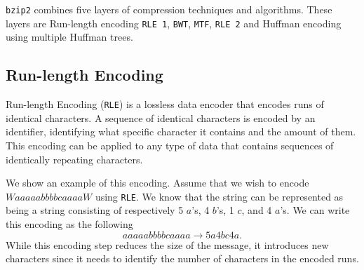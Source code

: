 \documentclass{article}
\begin{document}
\texttt{bzip2} combines five layers of compression techniques and algorithms. These layers are Run-length encoding \texttt{RLE 1}, \texttt{BWT}, \texttt{MTF}, \texttt{RLE 2} and Huffman encoding using multiple Huffman trees.

\subsection{Run-length Encoding}\label{BZIP2RLE}
Run-length Encoding (\texttt{RLE}) is a lossless data encoder that encodes runs of identical characters. A sequence of identical characters is encoded by an identifier, identifying what specific character it contains and the amount of them. This encoding can be applied to any type of data that contains sequences of identically repeating characters.

We show an example of this encoding. Assume that we wish to encode \(WaaaaabbbbcaaaaW\) using \texttt{RLE}. We know that the string can be represented as being a string consisting of respectively 5 \(a\)'s, 4 \(b\)'s, 1 \(c\), and 4 \(a\)'s. We can write this encoding as the following
\[
aaaaabbbbcaaaa \rightarrow 5a4bc4a.
\]
While this encoding step reduces the size of the message, it introduces new characters since it needs to identify the number of characters in the encoded runs.
\\
\end{document}
